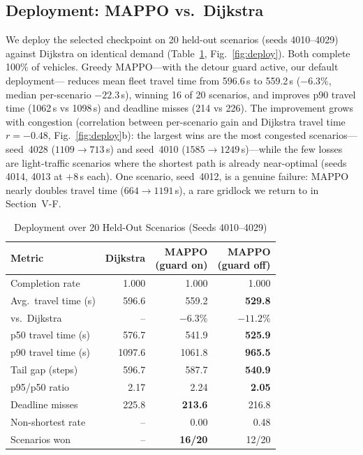 \subsection{Deployment: MAPPO vs.\ Dijkstra}
We deploy the selected checkpoint on 20 held-out scenarios (seeds 4010--4029) against
Dijkstra on identical demand (Table~\ref{tab:deploy}, Fig.~\ref{fig:deploy}). Both complete
100\% of vehicles. Greedy MAPPO---with the detour guard active, our default deployment---%
reduces mean fleet travel time from 596.6\,s to 559.2\,s ($-6.3\%$, median per-scenario
$-22.3$\,s), winning 16 of 20 scenarios, and improves p90 travel time (1062\,s vs 1098\,s)
and deadline misses (214 vs 226). The improvement grows with congestion (correlation
between per-scenario gain and Dijkstra travel time $r{=}-0.48$, Fig.~\ref{fig:deploy}b):
the largest wins are the most congested scenarios---seed~4028 ($1109\to713$\,s) and
seed~4010 ($1585\to1249$\,s)---while the few losses are light-traffic scenarios where the
shortest path is already near-optimal (seeds 4014, 4013 at $+8$\,s each). One scenario,
seed~4012, is a genuine failure: MAPPO nearly doubles travel time ($664\to1191$\,s), a rare
gridlock we return to in Section~V-F.

\begin{table}[!t]
\caption{Deployment over 20 Held-Out Scenarios (Seeds 4010--4029)}
\label{tab:deploy}
\centering
\footnotesize
\setlength{\tabcolsep}{3.4pt}
\begin{tabular}{lrrr}
\toprule
Metric & Dijkstra & \shortstack[r]{MAPPO\\(guard on)} & \shortstack[r]{MAPPO\\(guard off)} \\
\midrule
Completion rate       & 1.000 & 1.000 & 1.000 \\
Avg.\ travel time (s) & 596.6 & 559.2 & \textbf{529.8} \\
\quad vs.\ Dijkstra   & --    & $-6.3\%$ & $\mathbf{-11.2\%}$ \\
p50 travel time (s)   & 576.7 & 541.9 & \textbf{525.9} \\
p90 travel time (s)   & 1097.6 & 1061.8 & \textbf{965.5} \\
Tail gap (steps)      & 596.7 & 587.7 & \textbf{540.9} \\
p95/p50 ratio         & 2.17  & 2.24  & \textbf{2.05} \\
Deadline misses       & 225.8 & \textbf{213.6} & 216.8 \\
Non-shortest rate     & --    & 0.00  & 0.48 \\
Scenarios won         & --    & \textbf{16/20} & 12/20 \\
\bottomrule
\end{tabular}
\end{table}

